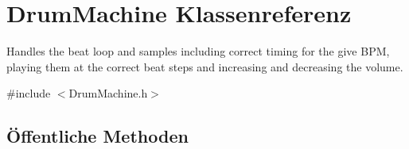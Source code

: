 \hypertarget{class_drum_machine}{}\section{Drum\+Machine Klassenreferenz}
\label{class_drum_machine}


Handles the beat loop and samples including correct timing for the give B\+PM, playing them at the correct beat steps and increasing and decreasing the volume.  




{\ttfamily \#include $<$Drum\+Machine.\+h$>$}

\subsection*{Öffentliche Methoden}
